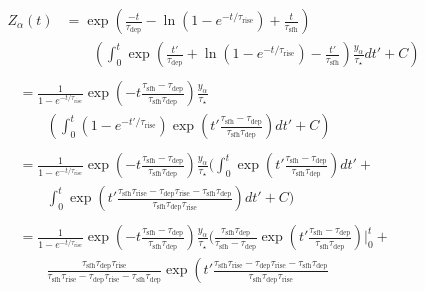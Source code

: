 \documentclass[12pt]{article}
\newcommand{\timescale}[1]{\ensuremath{\tau_\text{#1}}}
\begin{document}
\begin{subequations}\begin{align}
\begin{split}
Z_\alpha(t) &= \exp\left(
\frac{-t}{\timescale{dep}} - \ln (1 - e^{-t / \timescale{rise}}) +
\frac{t}{\timescale{sfh}}
\right)
\\
&\qquad \left(
\int_0^t \exp\left(
\frac{t'}{\timescale{dep}} + \ln (1 - e^{-t / \timescale{rise}}) -
\frac{t'}{\timescale{sfh}}
\right)
\frac{y_\alpha}{\tau_\star} dt' + C
\right)
\end{split}
\\
\begin{split}
&= \frac{1}{1 - e^{-t / \timescale{rise}}}
\exp \left(-t\frac{
	\timescale{sfh} - \timescale{dep}
}{
	\timescale{sfh}\timescale{dep}
}\right) \frac{y_\alpha}{\tau_\star}
\\
&\qquad \left( \int_0^t (1 - e^{-t' / \timescale{rise}}) \exp \left(
t' \frac{\timescale{sfh} - \timescale{dep}}{\timescale{sfh} \timescale{dep}}
\right)dt' + C
\right)
\end{split}
\\
\begin{split}
&= \frac{1}{1 - e^{-t / \timescale{rise}}}
\exp \left(-t\frac{
	\timescale{sfh} - \timescale{dep}
}{
	\timescale{sfh}\timescale{dep}
}\right) \frac{y_\alpha}{\tau_\star} \bigg( \int_0^t
\exp\left(t'\frac{
	\timescale{sfh} - \timescale{dep}
}{
	\timescale{sfh}\timescale{dep}
} \right) dt' +
\\
&\qquad
\int_0^t \exp\left(t'\frac{
	\timescale{sfh}\timescale{rise} - \timescale{dep}\timescale{rise} -
	\timescale{sfh}\timescale{dep}
}{
	\timescale{sfh}\timescale{dep}\timescale{rise}
}\right) dt' + C \bigg)
\end{split}
\\
\begin{split}
&= \frac{1}{1 - e^{-t / \timescale{rise}}}
\exp \left(-t\frac{
	\timescale{sfh} - \timescale{dep}
}{
	\timescale{sfh}\timescale{dep}
}\right) \frac{y_\alpha}{\tau_\star} \bigg(\frac{
	\timescale{sfh}\timescale{dep}
}{
	\timescale{sfh} - \timescale{dep}
} \exp \left(t' \frac{
	\timescale{sfh} - \timescale{dep}
}{
	\timescale{sfh}\timescale{dep}
}\right) \bigg|_0^t +
\\
&\qquad \frac{
	\timescale{sfh}\timescale{dep}\timescale{rise}
}{
	\timescale{sfh}\timescale{rise} - \timescale{dep}\timescale{rise} -
	\timescale{sfh}\timescale{dep}
} \exp\left(
t'\frac{
	\timescale{sfh}\timescale{rise} - \timescale{dep}\timescale{rise} -
	\timescale{sfh}\timescale{dep}
}{
	\timescale{sfh}\timescale{dep}\timescale{rise}
}
\end{split}
\end{align}
\end{subequations}
\end{document}
